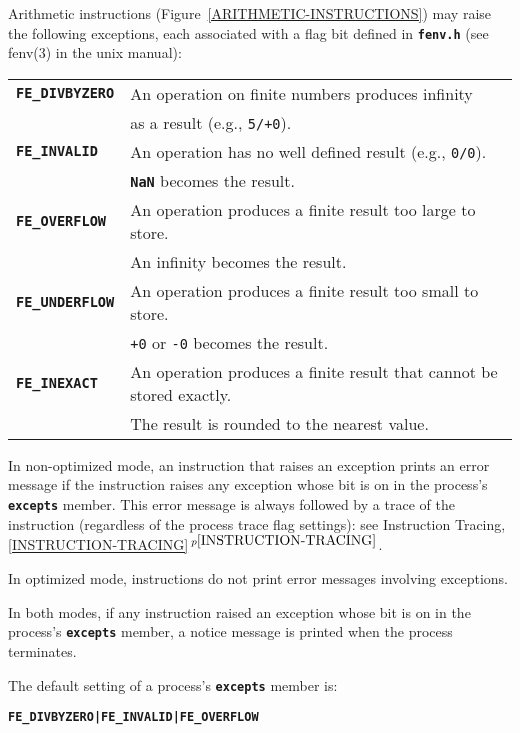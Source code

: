 \documentclass[12pt]{article}
\makeatletter
\newcommand{\TT}[1]{{\tt \bfseries #1}}
\newcommand{\ttkey}[1]{\TT{#1}\index{#1@{\tt #1}}}
\newcommand{\itemref}[1]{\ref{#1}$\,^{p\pageref{#1}}$}
\makeatother
\begin{document}
Arithmetic instructions (Figure~\ref{ARITHMETIC-INSTRUCTIONS})
may raise the following exceptions, each
associated with a flag bit defined in \TT{fenv.h}
(see fenv(3) in the unix manual):
\begin{center}
\begin{tabular}{|l|l|}
\hline
\ttkey{FE\_DIVBYZERO} &  An operation on finite numbers produces infinity \\
                      &  as a result (e.g., {\tt 5/+0}).
\\\hline
\ttkey{FE\_INVALID} & An operation has no well defined result
                      (e.g., {\tt 0/0}). \\
		    & \TT{NaN} becomes the result.
\\\hline
\ttkey{FE\_OVERFLOW} & An operation produces a finite result too large to
                       store. \\
		     & An infinity becomes the result.
\\\hline
\ttkey{FE\_UNDERFLOW} & An operation produces a finite result too small to
                        store. \\
	              & {\tt +0} or {\tt -0} becomes the result.
\\\hline
\ttkey{FE\_INEXACT} & An operation produces a finite result that cannot
                      be stored exactly. \\
		    & The result is rounded to the nearest value.
\\\hline
\end{tabular}
\end{center}

In non-optimized mode, an instruction that raises an exception prints
an error message if the instruction raises any exception whose bit
is on in the process's \TT{excepts} member.
This error message is always followed by a trace of the instruction
(regardless of the process trace flag settings): see
Instruction Tracing, \itemref{INSTRUCTION-TRACING}.

In optimized mode, instructions do not print error messages
involving exceptions.

In both modes, if any instruction raised an exception whose bit
is on in the process's \TT{excepts} member, a notice message is
printed when the process terminates.

The default setting of a process's \TT{excepts} member
is:
\begin{center}
\TT{FE\_DIVBYZERO|FE\_INVALID|FE\_OVERFLOW}
\end{center}
\end{document}
